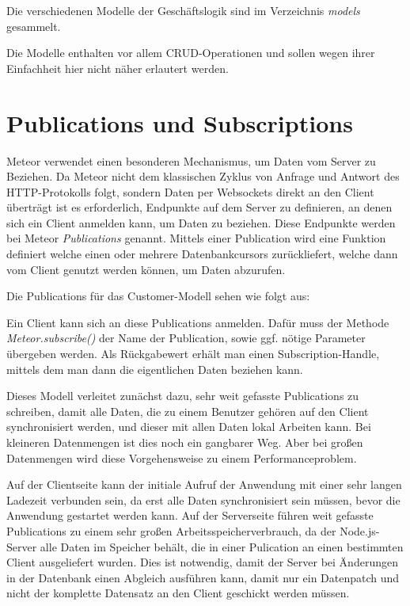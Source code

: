 Die verschiedenen Modelle der Geschäftslogik sind im Verzeichnis \textit{models}
gesammelt.

Die Modelle enthalten vor allem CRUD-Operationen und sollen wegen ihrer
Einfachheit hier nicht näher erlautert werden.

\section{Publications und Subscriptions}

Meteor verwendet einen besonderen Mechanismus, um Daten vom Server zu Beziehen.
Da Meteor nicht dem klassischen Zyklus von Anfrage und Antwort des
HTTP-Protokolls folgt, sondern Daten per Websockets direkt an den Client
überträgt ist es erforderlich, Endpunkte auf dem Server zu definieren, an denen
sich ein Client anmelden kann, um Daten zu beziehen. Diese Endpunkte werden bei
Meteor \textit{Publications} genannt. Mittels einer Publication wird eine
Funktion  definiert welche einen oder mehrere Datenbankcursors zurückliefert,
welche dann vom Client genutzt werden können, um Daten abzurufen.

Die Publications für das Customer-Modell sehen wie folgt aus:



Ein Client kann sich an diese Publications anmelden. Dafür muss der Methode
\textit{Meteor.subscribe()} der Name der Publication, sowie ggf. nötige
Parameter übergeben werden. Als Rückgabewert erhält man einen
Subscription-Handle, mittels dem man dann die eigentlichen Daten beziehen kann.

Dieses Modell verleitet zunächst dazu, sehr weit gefasste Publications zu
schreiben, damit alle Daten, die zu einem Benutzer gehören auf den Client
synchronisiert werden, und dieser mit allen Daten lokal Arbeiten kann. Bei kleineren
Datenmengen ist dies noch ein gangbarer Weg. Aber bei großen Datenmengen wird diese
Vorgehensweise zu einem Performanceproblem.

Auf der Clientseite kann der initiale Aufruf der Anwendung mit einer sehr langen
Ladezeit verbunden sein, da erst alle Daten synchronisiert sein müssen, bevor
die Anwendung gestartet werden kann. Auf der Serverseite führen weit gefasste
Publications zu einem sehr großen Arbeitsspeicherverbrauch, da der
Node.js-Server alle Daten im Speicher behält, die in einer Pulication an einen
bestimmten Client ausgeliefert wurden. Dies ist notwendig, damit der Server bei
Änderungen in der Datenbank einen Abgleich ausführen kann, damit nur ein
Datenpatch und nicht der komplette Datensatz an den Client geschickt werden
müssen.

